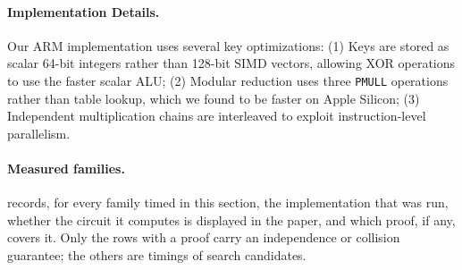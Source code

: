 \paragraph{Implementation Details.}
Our ARM implementation uses several key optimizations:
(1) Keys are stored as scalar 64-bit integers rather than 128-bit SIMD vectors,
    allowing XOR operations to use the faster scalar ALU;
(2) Modular reduction uses three \texttt{PMULL} operations rather than table lookup,
    which we found to be faster on Apple Silicon;
(3) Independent multiplication chains are interleaved to exploit instruction-level parallelism.

\paragraph{Measured families.}
\label{sec:experiments:families}
 records, for every family timed in this section, the
implementation that was run, whether the circuit it computes is displayed in
the paper, and which proof, if any, covers it.  Only the rows with a proof
carry an independence or collision guarantee; the others are timings of
search candidates.
\begingroup
\footnotesize
\setlength{\tabcolsep}{3pt}
